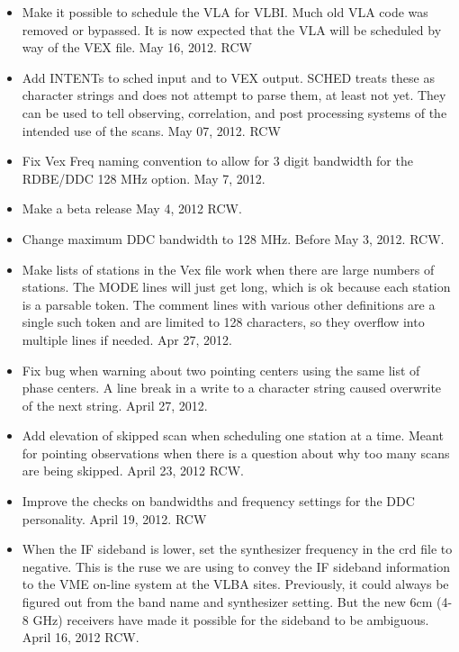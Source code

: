 \documentclass{report}
\begin{document}
\begin{itemize}
\item Make it possible to schedule the VLA for VLBI.  Much old VLA
code was removed or bypassed.  It is now expected that the VLA will be
scheduled by way of the VEX file.  May 16, 2012. RCW

\item Add INTENTs to sched input and to VEX output.  SCHED treats these
as character strings and does not attempt to parse them, at least not 
yet.  They can be used to tell observing, correlation, and post processing
systems of the intended use of the scans.  May 07, 2012.  RCW

\item Fix Vex Freq naming convention to allow for 3 digit bandwidth for
the RDBE/DDC 128 MHz option.  May 7, 2012.

\item Make a beta release May 4, 2012 RCW.

\item Change maximum DDC bandwidth to 128 MHz.  Before May 3, 2012. RCW.

\item Make lists of stations in the Vex file work when there are 
large numbers of stations.  The MODE lines will just get long, which
is ok because each station is a parsable token.  The comment lines
with various other definitions are a single such token and are limited
to 128 characters, so they overflow into multiple lines if needed.
Apr 27, 2012.

\item Fix bug when warning about two pointing centers using the same 
list of phase centers.  A line break in a write to a character string
caused overwrite of the next string.  April 27, 2012.

\item Add elevation of skipped scan when scheduling one station at
a time.  Meant for pointing observations when there is a question
about why too many scans are being skipped.  April 23, 2012  RCW.

\item Improve the checks on bandwidths and frequency settings for the
DDC personality.  April 19, 2012. RCW

\item When the IF sideband is lower, set the synthesizer frequency
in the crd file to negative.  This is the ruse we are using to convey
the IF sideband information to the VME on-line system at the VLBA
sites.  Previously, it could always be figured out from the band
name and synthesizer setting.  But the new 6cm (4-8 GHz) receivers
have made it possible for the sideband to be ambiguous.  April 16, 2012
RCW.


\end{itemize}
\end{document}
